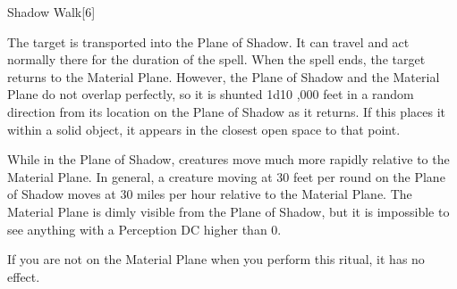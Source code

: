 \begin{spellsection}{Shadow Walk}[6]
    \begin{spellheader}
    \end{spellheader}
    \begin{spellcontent}
        \begin{spelltargetinginfo}
        \end{spelltargetinginfo}
        \begin{spelleffects}
            \spelleffect The target is transported into the Plane of Shadow. It can travel and act normally there for the duration of the spell. When the spell ends, the target returns to the Material Plane. However, the Plane of Shadow and the Material Plane do not overlap perfectly, so it is shunted 1d10 ,000 feet in a random direction from its location on the Plane of Shadow as it returns. If this places it within a solid object, it appears in the closest open space to that point.
            \spelldur \durext \dismissable
        \end{spelleffects}
    \end{spellcontent}
    \begin{spellfooter}
        \spellnotes While in the Plane of Shadow, creatures move much more rapidly relative to the Material Plane. In general, a creature moving at 30 feet per round on the Plane of Shadow moves at 30 miles per hour relative to the Material Plane. The Material Plane is dimly visible from the Plane of Shadow, but it is impossible to see anything with a Perception DC higher than 0.

        If you are not on the Material Plane when you perform this ritual, it has no effect.
    \end{spellfooter}
\end{spellsection}

